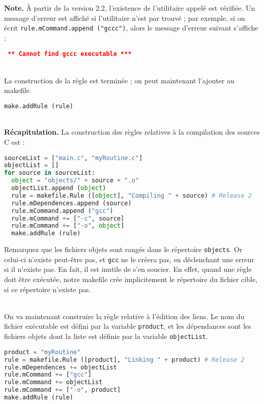 \documentclass[a4paper,11pt]{extarticle}
\begin{document}
{\bf Note.}\label{verifUtilitaire} À partir de la version 2.2, l'existence de l'utilitaire appelé est vérifiée. Un message d'erreur est affiché si l'utilitaire n'est par trouvé ; par exemple, si on écrit \texttt{rule.mCommand.append ("gccc")}, alors le message d'erreur suivant s'affiche :
\begin{mdframed}[hidealllines=true,backgroundcolor=lightgray!20]
\tt\footnotesize
\textcolor{red}{\bf*** Cannot find~\textquotesingle gccc\textquotesingle~executable ***}
\end{mdframed}

~\\La construction de la règle est terminée ; on peut maintenant l'ajouter au makefile.
\begin{lstlisting}[language=py]
  make.addRule (rule)
\end{lstlisting}


~\\{\bf Récapitulation.} La construction des règles relatives à la compilation des sources C est :
\begin{lstlisting}[language=py]
sourceList = ["main.c", "myRoutine.c"]
objectList = []
for source in sourceList:
  object = "objects/" + source + ".o"
  objectList.append (object)
  rule = makefile.Rule ([object], "Compiling " + source) # Release 2
  rule.mDependences.append (source)
  rule.mCommand.append ("gcc")
  rule.mCommand += ["-c", source]
  rule.mCommand += ["-o", object]
  make.addRule (rule)
\end{lstlisting}
Remarquez que les fichiers objets sont rangés dans le répertoire \texttt{objects}. Or celui-ci n'existe peut-être pas, et \texttt{gcc} ne le créera pas, en déclenchant une erreur si il n'existe pas. En fait, il est inutile de s'en soucier. En effet, quand une règle doit être exécutée, notre makefile crée implicitement le répertoire du fichier cible, si ce répertoire n'existe pas.

~\\On va maintenant construire la règle relative à l'édition des liens. Le nom du fichier exécutable est défini par la variable \texttt{product}, et les dépendances sont les fichiers objets dont la liste est définie par la variable \texttt{objectList}.
\begin{lstlisting}[language=py]
product = "myRoutine"
rule = makefile.Rule ([product], "Linking " + product) # Release 2
rule.mDependences += objectList
rule.mCommand += ["gcc"]
rule.mCommand += objectList
rule.mCommand += ["-o", product]
make.addRule (rule)
\end{lstlisting}
\end{document}

